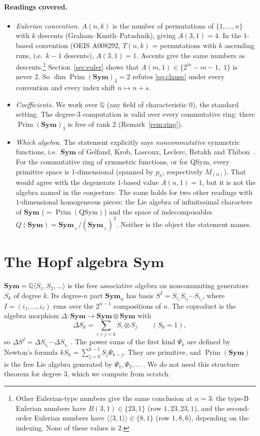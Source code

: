 \documentclass[11pt]{article}
\theoremstyle{remark}
\newcommand{\NSym}{\mathbf{Sym}}
\newcommand{\Prim}{\operatorname{Prim}}
\begin{document}
\paragraph{Readings covered.}
\begin{itemize}
\item \emph{Eulerian convention.} $A(n,k)$ is the number of permutations of
$\{1,\dots,n\}$ with $k$ descents (Graham--Knuth--Patashnik), giving
$A(3,1)=4$. In the $1$-based convention (OEIS A008292, $T(n,k)$ = permutations with $k$
ascending runs, i.e.\ $k-1$ descents), $A(3,1)=1$. Ascents give the same
numbers as descents.\footnote{Other Eulerian-type numbers give the same conclusion
at $n=3$: the type-B Eulerian numbers have $B(3,1)\in\{23,1\}$ (row $1,23,23,1$), and
the second-order Eulerian numbers have $\langle\!\langle 3,1\rangle\!\rangle\in\{8,1\}$
(row $1,8,6$), depending on the indexing. None of these values is $2$.}
Section~\ref{sec:euler} shows that $A(m,1)\in\{2^m-m-1,\;1\}$
is never $2$. So $\dim\Prim(\NSym)_3=2$ refutes \eqref{eq:clause} under every
convention and every index shift $n\mapsto n+s$.
\item \emph{Coefficients.} We work over $\mathbb Q$ (any field of characteristic $0$),
the standard setting. The degree-$3$ computation is valid over every commutative
ring: there $\Prim(\NSym)_3$ is free of rank $2$ (Remark~\ref{rem:ring}).
\item \emph{Which algebra.} The statement explicitly says \emph{noncommutative}
symmetric functions, i.e.\ $\NSym$ of Gelfand, Krob, Lascoux, Leclerc, Retakh and Thibon~\cite{GKLLRT}.
For the commutative ring of symmetric functions, or for QSym, every primitive space
is $1$-dimensional (spanned by $p_n$, respectively $M_{(n)}$). That would agree
with the degenerate $1$-based value $A(n,1)=1$, but it is not the algebra named
in the conjecture. The same holds for two other readings with $1$-dimensional homogeneous
pieces: the Lie algebra of infinitesimal characters of $\NSym$ ($=\Prim(\mathrm{QSym})$)
and the space of indecomposables $Q(\NSym)=\NSym_+/(\NSym_+)^2$. Neither is the object the
statement names.
\end{itemize}

\section{\texorpdfstring{The Hopf algebra $\NSym$}{The Hopf algebra NSym}}

$\NSym=\mathbb Q\langle S_1,S_2,\dots\rangle$ is the free associative algebra on
noncommuting generators $S_k$ of degree $k$. Its degree-$n$ part $\NSym_n$ has
basis $S^I=S_{i_1}S_{i_2}\cdots S_{i_\ell}$, where $I=(i_1,\dots,i_\ell)$ runs over the
$2^{n-1}$ compositions of $n$. The coproduct is the algebra morphism
$\Delta:\NSym\to\NSym\otimes\NSym$ with
\[
\Delta S_k=\sum_{i+j=k}S_i\otimes S_j\qquad(S_0=1),
\]
so $\Delta S^I=\Delta S_{i_1}\cdots\Delta S_{i_\ell}$ \cite[\S3]{GKLLRT}. The power sums of the
first kind $\Psi_k$ are defined by Newton's formula
$kS_k=\sum_{j=0}^{k-1}S_j\Psi_{k-j}$. They are primitive, and $\Prim(\NSym)$ is the free
Lie algebra generated by $\Psi_1,\Psi_2,\dots$ \cite{GKLLRT}. We do not need
this structure theorem for degree $3$, which we compute from scratch.
\end{document}
